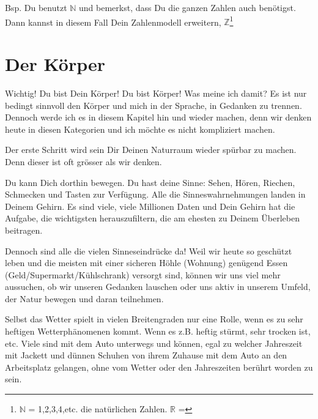 \documentclass[11pt,titlepage,a5paper]{book}
\begin{document}
Bsp. Du benutzt $\mathbb{N}$ und bemerkst, dass Du die ganzen Zahlen auch benötigst. Dann kannst in diesem Fall Dein Zahlenmodell erweitern, $\mathbb{Z}$\footnote{$\mathbb{N}$ = 1,2,3,4,etc. die natürlichen Zahlen. $\mathbb{R}$ = }
































\section*{Der Körper}

Wichtig! Du bist Dein Körper! Du bist Körper! Was meine ich damit? Es ist nur bedingt sinnvoll den Körper und mich in der Sprache, in Gedanken zu trennen. Dennoch werde ich es in diesem Kapitel hin und wieder machen, denn wir denken heute in diesen Kategorien und ich möchte es nicht kompliziert machen.

Der erste Schritt wird sein Dir Deinen Naturraum wieder spürbar zu machen. Denn dieser ist oft grösser als wir denken. 

Du kann Dich dorthin bewegen. Du hast deine Sinne: Sehen, Hören, Riechen, Schmecken und Tasten zur Verfügung. Alle die Sinneswahrnehmungen landen in Deinem Gehirn. Es sind viele, viele Millionen Daten und Dein Gehirn hat die Aufgabe, die wichtigsten herauszufiltern, die am ehesten zu Deinem Überleben beitragen. 

Dennoch sind alle die vielen Sinneseindrücke da! Weil wir heute so geschützt leben und die meisten mit einer sicheren Höhle (Wohnung) genügend Essen (Geld/Supermarkt/Kühlschrank) versorgt sind, können wir uns viel mehr aussuchen, ob wir unseren Gedanken lauschen oder uns aktiv in unserem Umfeld, der Natur bewegen und daran teilnehmen.

Selbst das Wetter spielt in vielen Breitengraden nur eine Rolle, wenn es zu sehr heftigen Wetterphänomenen kommt. Wenn es z.B. heftig stürmt, sehr trocken ist, etc. Viele sind mit dem Auto unterwegs und können, egal zu welcher Jahreszeit mit Jackett und dünnen Schuhen von ihrem Zuhause mit dem Auto an den Arbeitsplatz gelangen, ohne vom Wetter oder den Jahreszeiten berührt worden zu sein.
\end{document}

